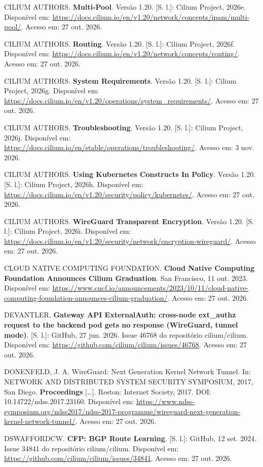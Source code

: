 \documentclass[12pt,openany,oneside,a4paper,chapter=TITLE,english,brazil]{abntex2}
\newenvironment{referenciasabnt}
  {\begin{flushleft}\SingleSpacing\setlength{\parindent}{0pt}\setlength{\parskip}{\baselineskip}}
  {\end{flushleft}}
\begin{document}
\begin{referenciasabnt}
CILIUM AUTHORS. \textbf{Multi-Pool}. Versão 1.20. {[}S. l.{]}: Cilium Project, 2026e. Disponível em: \url{https://docs.cilium.io/en/v1.20/network/concepts/ipam/multi-pool/}. Acesso em: 27 out. 2026.

CILIUM AUTHORS. \textbf{Routing}. Versão 1.20. {[}S. l.{]}: Cilium Project, 2026f. Disponível em: \url{https://docs.cilium.io/en/v1.20/network/concepts/routing/}. Acesso em: 27 out. 2026.

CILIUM AUTHORS. \textbf{System Requirements}. Versão 1.20. {[}S. l.{]}: Cilium Project, 2026g. Disponível em: \url{https://docs.cilium.io/en/v1.20/operations/system_requirements/}. Acesso em: 27 out. 2026.

CILIUM AUTHORS. \textbf{Troubleshooting}. Versão 1.20. {[}S. l.{]}: Cilium Project, 2026j. Disponível em: \url{https://docs.cilium.io/en/stable/operations/troubleshooting/}. Acesso em: 3 nov. 2026.

CILIUM AUTHORS. \textbf{Using Kubernetes Constructs In Policy}. Versão 1.20. {[}S. l.{]}: Cilium Project, 2026h. Disponível em: \url{https://docs.cilium.io/en/v1.20/security/policy/kubernetes/}. Acesso em: 27 out. 2026.

CILIUM AUTHORS. \textbf{WireGuard Transparent Encryption}. Versão 1.20. {[}S. l.{]}: Cilium Project, 2026i. Disponível em: \url{https://docs.cilium.io/en/v1.20/security/network/encryption-wireguard/}. Acesso em: 27 out. 2026.

CLOUD NATIVE COMPUTING FOUNDATION. \textbf{Cloud Native Computing Foundation Announces Cilium Graduation}. San Francisco, 11 out. 2023. Disponível em: \url{https://www.cncf.io/announcements/2023/10/11/cloud-native-computing-foundation-announces-cilium-graduation/}. Acesso em: 27 out. 2026.

DEVANTLER. \textbf{Gateway API ExternalAuth: cross-node ext\_authz request to the backend pod gets no response (WireGuard, tunnel mode)}. {[}S. l.{]}: GitHub, 27 jun. 2026. Issue 46768 do repositório cilium/cilium. Disponível em: \url{https://github.com/cilium/cilium/issues/46768}. Acesso em: 27 out. 2026.

DONENFELD, J. A. WireGuard: Next Generation Kernel Network Tunnel. In: NETWORK AND DISTRIBUTED SYSTEM SECURITY SYMPOSIUM, 2017, San Diego. \textbf{Proceedings} {[}\ldots{]}. Reston: Internet Society, 2017. DOI: 10.14722/ndss.2017.23160. Disponível em: \url{https://www.ndss-symposium.org/ndss2017/ndss-2017-programme/wireguard-next-generation-kernel-network-tunnel/}. Acesso em: 27 out. 2026.

DSWAFFORDCW. \textbf{CFP: BGP Route Learning}. {[}S. l.{]}: GitHub, 12 set. 2024. Issue 34841 do repositório cilium/cilium. Disponível em: \url{https://github.com/cilium/cilium/issues/34841}. Acesso em: 27 out. 2026.


\end{referenciasabnt}
\end{document}
